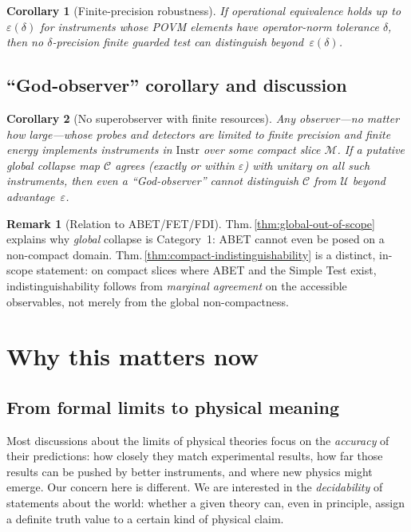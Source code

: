 \documentclass[12pt]{article}
\theoremstyle{definition}
\newtheorem{remark}{Remark}[section]
\theoremstyle{plain}
\newtheorem{corollary}{Corollary}[section]
\begin{document}
\begin{corollary}[Finite-precision robustness]
If operational equivalence holds up to $\varepsilon(\delta)$ for instruments whose POVM elements have operator-norm tolerance $\delta$, then no \emph{$\delta$-precision} finite guarded test can distinguish beyond~$\varepsilon(\delta)$.
\end{corollary}

\subsection{“God-observer” corollary and discussion}
\label{subsec:god-observer}

\begin{corollary}[No superobserver with finite resources]
Any observer—no matter how large—whose probes and detectors are limited to finite precision and finite energy implements instruments in $\mathrm{Instr}$ over some compact slice $\mathcal M$. If a putative global collapse map $\mathcal C$ agrees (exactly or within $\varepsilon$) with unitary on all such instruments, then even a ``God-observer'' cannot distinguish $\mathcal C$ from $\mathcal U$ beyond advantage~$\varepsilon$.
\end{corollary}

\begin{remark}[Relation to ABET/FET/FDI]
Thm.\,\ref{thm:global-out-of-scope} explains why \emph{global} collapse is Category~1: ABET cannot even be posed on a non-compact domain. Thm.\,\ref{thm:compact-indistinguishability} is a distinct, in-scope statement: on compact slices where ABET and the Simple Test exist, indistinguishability follows from \emph{marginal agreement} on the accessible observables, not merely from the global non-compactness.
\end{remark}


\section{Why this matters now}

\subsection{From formal limits to physical meaning}

Most discussions about the limits of physical theories focus on the
\emph{accuracy} of their predictions: how closely they match experimental
results, how far those results can be pushed by better instruments, and where
new physics might emerge. Our concern here is different. We are interested in
the \emph{decidability} of statements about the world: whether a given theory
can, even in principle, assign a definite truth value to a certain kind of
physical claim.
\end{document}
